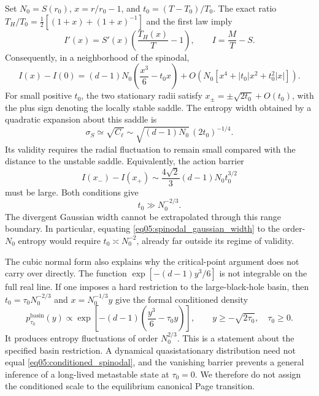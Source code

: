 \documentclass[11pt,letterpaper]{article}
\theoremstyle{plain}
\theoremstyle{definition}
\theoremstyle{remark}
\begin{document}
Set $N_0=S(r_0)$, $x=r/r_0-1$, and $t_0=(T-T_0)/T_0$. The exact ratio $T_H/T_0=\tfrac12[(1+x)+(1+x)^{-1}]$ and the first law imply
\begin{equation}
 I'(x)=S'(x)\left(\frac{T_H(x)}{T}-1\right),
 \qquad I=\frac{M}{T}-S.
 \label{eq05:spinodal_action_derivative}
\end{equation}
Consequently, in a neighborhood of the spinodal,
\begin{equation}
 I(x)-I(0)
 =(d-1)N_0\left(\frac{x^3}{6}-t_0x\right)
 +O\!\left(N_0[x^4+|t_0|x^2+t_0^2|x|]\right).
 \label{eq05:cubic_action}
\end{equation}
For small positive $t_0$, the two stationary radii satisfy $x_\pm=\pm\sqrt{2t_0}+O(t_0)$, with the plus sign denoting the locally stable saddle. The entropy width obtained by a quadratic expansion about this saddle is
\begin{equation}
 \sigma_S\simeq\sqrt{C_\ell}
 \sim\sqrt{(d-1)N_0}\,(2t_0)^{-1/4}.
 \label{eq05:spinodal_gaussian_width}
\end{equation}
Its validity requires the radial fluctuation to remain small compared with the distance to the unstable saddle. Equivalently, the action barrier
\begin{equation}
 I(x_-)-I(x_+)
 \sim\frac{4\sqrt2}{3}(d-1)N_0t_0^{3/2}
 \label{eq05:spinodal_barrier}
\end{equation}
must be large. Both conditions give
\begin{equation}
 t_0\gg N_0^{-2/3}.
 \label{eq05:spinodal_validity}
\end{equation}
The divergent Gaussian width cannot be extrapolated through this range boundary. In particular, equating \eqref{eq05:spinodal_gaussian_width} to the order-$N_0$ entropy would require $t_0\asymp N_0^{-2}$, already far outside its regime of validity.

The cubic normal form also explains why the critical-point argument does not carry over directly. The function $\exp[-(d-1)y^3/6]$ is not integrable on the full real line. If one imposes a hard restriction to the large-black-hole basin, then $t_0=\tau_0N_0^{-2/3}$ and $x=N_0^{-1/3}y$ give the formal conditioned density
\begin{equation}
 p_{\tau_0}^{\mathrm{basin}}(y)\propto
 \exp\!\left[-(d-1)\left(\frac{y^3}{6}-\tau_0y\right)\right],
 \qquad y\geq-\sqrt{2\tau_0},\quad \tau_0\geq0.
 \label{eq05:conditioned_spinodal}
\end{equation}
It produces entropy fluctuations of order $N_0^{2/3}$. This is a statement about the specified basin restriction. A dynamical quasistationary distribution need not equal \eqref{eq05:conditioned_spinodal}, and the vanishing barrier prevents a general inference of a long-lived metastable state at $\tau_0=0$. We therefore do not assign the conditioned scale to the equilibrium canonical Page transition.
\end{document}
